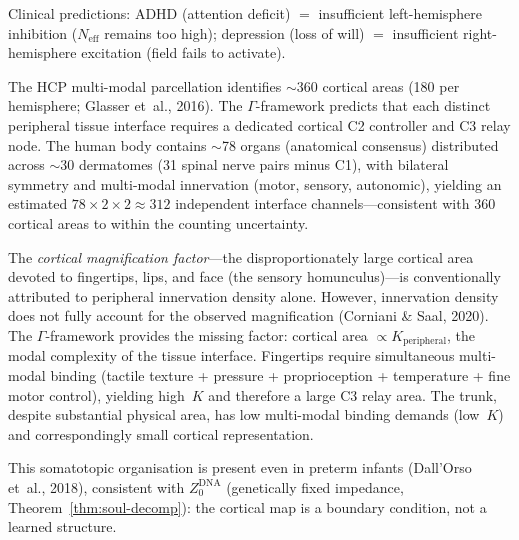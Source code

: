 \documentclass[aps,pre,twocolumn,superscriptaddress,floatfix]{revtex4-2}
\begin{document}
\begin{remark}
Clinical predictions:
ADHD (attention deficit) $=$ insufficient left-hemisphere
inhibition ($N_{\text{eff}}$ remains too high);
depression (loss of will) $=$ insufficient
right-hemisphere excitation (field fails to activate).
\end{remark}

\begin{remark}
\label{rem:cortical-peripheral}
The HCP multi-modal parcellation identifies
$\sim$360 cortical areas (180 per hemisphere;
Glasser et~al., 2016).
The $\Gamma$-framework predicts that each distinct
peripheral tissue interface requires a dedicated
cortical C2 controller and C3 relay node.
The human body contains $\sim$78 organs
(anatomical consensus) distributed across $\sim$30
dermatomes (31 spinal nerve pairs minus C1),
with bilateral symmetry and multi-modal innervation
(motor, sensory, autonomic), yielding an estimated
$78 \times 2 \times 2 \approx 312$ independent
interface channels---consistent with 360 cortical areas
to within the counting uncertainty.

The \emph{cortical magnification factor}---the
disproportionately large cortical area devoted to
fingertips, lips, and face (the sensory homunculus)---is
conventionally attributed to peripheral innervation
density alone.
However, innervation density does not fully account
for the observed magnification (Corniani \& Saal, 2020).
The $\Gamma$-framework provides the missing factor:
cortical area $\propto K_{\text{peripheral}}$, the
modal complexity of the tissue interface.
Fingertips require simultaneous multi-modal binding
(tactile texture + pressure + proprioception +
temperature + fine motor control), yielding high~$K$
and therefore a large C3 relay area.
The trunk, despite substantial physical area, has
low multi-modal binding demands (low~$K$) and
correspondingly small cortical representation.

This somatotopic organisation is present even in
preterm infants (Dall'Orso et~al., 2018), consistent
with $Z_0^{\text{DNA}}$ (genetically fixed impedance,
Theorem~\ref{thm:soul-decomp}): the cortical map
is a boundary condition, not a learned structure.
\end{remark}
\end{document}
